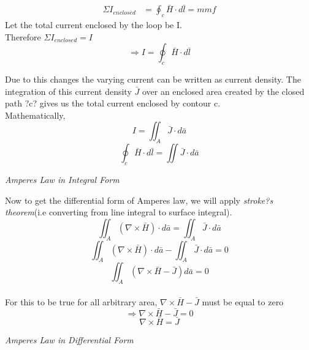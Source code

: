 \begin{align*}
\Sigma I_{enclosed} &= \oint_c\bar{H}\cdot d\bar{l} = mmf
\end{align*}
Let the total current enclosed by the loop be I.\\
Therefore $\Sigma I_{enclosed} = I$ \\
\begin{equation*}
\Rightarrow I = \oint_c\bar{H}\cdot d\bar{l}
\end{equation*}

Due to this changes the varying current can be written as current density. The  integration of this current density $\bar{J}$ over an enclosed area created by the closed path ?c? gives us the total current enclosed by contour c.\\
Mathematically, \\ 

\begin{equation*}
I = \iint_A\bar{J} \cdot d\bar{a}
\end{equation*}
\begin{equation}
\boxed{\oint_c\bar{H} \cdot d\bar{l} = \iint\bar{J} \cdot d\bar{a}}
\end{equation}
\begin{center}
	\emph{Amperes Law in Integral Form}
\end{center} 

Now to get the differential form of Amperes law, we will apply \emph{stroke?s theorem}(i.e converting from line integral to surface integral).\\

\begin{equation*}
\iint_A(\nabla \times \bar{H}) \cdot d\bar{a} = \iint_A\bar{J} \cdot d\bar{a}
\end{equation*}
\begin{equation*}
\iint_A(\nabla \times \bar{H}) \cdot d\bar{a} - \iint_A\bar{J} \cdot d\bar{a} = 0
\end{equation*}
\begin{equation*}
\iint_A(\nabla \times \bar{H} - \bar{J})d\bar{a} = 0
\end{equation*} \\

For this to be true for all arbitrary area, $\nabla \times \bar{H} - \bar{J}$ must be equal to zero \\
\begin{equation*}
\Rightarrow \nabla \times \bar{H} - \bar{J} = 0
\end{equation*}
\begin{equation}
\boxed{\nabla \times \bar{H} = \bar{J}}
\end{equation}
\begin{center}
	\emph{Amperes Law in Differential Form}
\end{center} 

